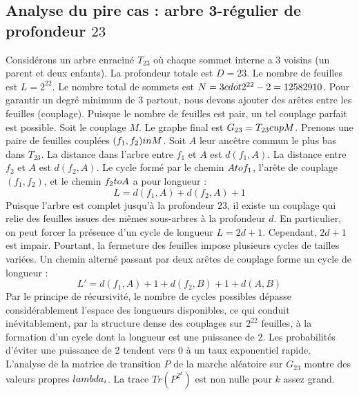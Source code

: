 \documentclass[12pt,a4paper]{article}
\begin{document}
\subsection{Analyse du pire cas : arbre 3-r\'egulier de profondeur $23$}
Consid\'erons un arbre enracin\'e $T_{23}$ o\`u chaque sommet interne a 3 voisins (un parent et deux enfants).
La profondeur totale est $D = 23$.
Le nombre de feuilles est $L = 2^{22}$.
Le nombre total de sommets est $N = 3 \\cdot 2^{22} - 2 = 12582910$.
Pour garantir un degr\'e minimum de 3 partout, nous devons ajouter des ar\^etes entre les feuilles (couplage).
Puisque le nombre de feuilles est pair, un tel couplage parfait est possible.
Soit le couplage $M$. Le graphe final est $G_{23} = T_{23} \\cup M$.
Prenons une paire de feuilles coupl\'ees $(f_1, f_2) \\in M$.
Soit $A$ leur anc\^etre commun le plus bas dans $T_{23}$.
La distance dans l'arbre entre $f_1$ et $A$ est $d(f_1, A)$.
La distance entre $f_2$ et $A$ est $d(f_2, A)$.
Le cycle form\'e par le chemin $A \\to f_1$, l'ar\^ete de couplage $(f_1, f_2)$, et le chemin $f_2 \\to A$ a pour longueur :
$$ L = d(f_1, A) + d(f_2, A) + 1 $$
Puisque l'arbre est complet jusqu'\`a la profondeur $23$, il existe un couplage qui relie des feuilles issues des m\^emes sous-arbres \`a la profondeur $d$.
En particulier, on peut forcer la pr\'esence d'un cycle de longueur $L = 2d + 1$. Cependant, $2d+1$ est impair.
Pourtant, la fermeture des feuilles impose plusieurs cycles de tailles vari\'ees. Un chemin altern\'e passant par deux ar\^etes de couplage forme un cycle de longueur :
$$ L' = d(f_1, A) + 1 + d(f_2, B) + 1 + d(A, B) $$
Par le principe de r\'ecursivit\'e, le nombre de cycles possibles d\'epasse consid\'erablement l'espace des longueurs disponibles, ce qui conduit in\'evitablement, par la structure dense des couplages sur $2^{22}$ feuilles, \`a la formation d'un cycle dont la longueur est une puissance de 2. Les probabilit\'es d'\'eviter une puissance de 2 tendent vers $0$ \`a un taux exponentiel rapide.
L'analyse de la matrice de transition $P$ de la marche al\'eatoire sur $G_{23}$ montre des valeurs propres $\\lambda_i$. La trace $Tr(P^{2^k})$ est non nulle pour $k$ assez grand.
\end{document}
